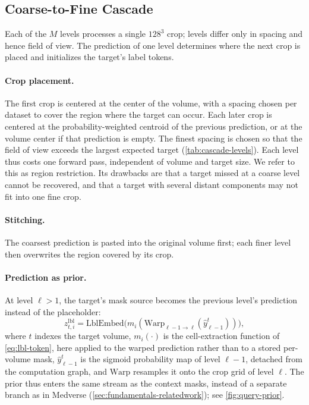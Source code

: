 \subsection{Coarse-to-Fine Cascade}\label{sec:methodology-cascade}

Each of the $M$ levels processes a single $128^3$ crop; levels differ only in
spacing and hence field of view. The prediction of one level determines where
the next crop is placed and initializes the target's label tokens.

\paragraph{Crop placement.}
The first crop is centered at the center of the volume, with a spacing chosen
per dataset to cover the region where the target can occur. Each later crop
is centered at the probability-weighted centroid of the previous prediction,
or at the volume center if that prediction is empty. The finest spacing is
chosen so that the field of view exceeds the largest expected target
(\autoref{tab:cascade-levels}). Each level thus costs one forward pass,
independent of volume and target size. We refer to this as region
restriction. Its drawbacks are that a target missed at a coarse level cannot
be recovered, and that a target with several distant components may not fit
into one fine crop.

\paragraph{Stitching.}
The coarsest prediction is pasted into the original volume first; each finer
level then overwrites the region covered by its crop.

\paragraph{Prediction as prior.}
At level $\ell > 1$, the target's mask source becomes the previous level's
prediction instead of the placeholder:
%
\begin{equation}
  z^{\text{lbl}}_{t,i} = \mathrm{LblEmbed}\big(m_i(\mathrm{Warp}_{\ell-1 \to \ell}(\hat{y}^t_{\ell-1}))\big),
  \label{eq:query-prior}
\end{equation}
%
where $t$ indexes the target volume, $m_i(\cdot)$ is the cell-extraction
function of \autoref{eq:lbl-token}, here applied to the warped prediction
rather than to a stored per-volume mask, $\hat{y}^t_{\ell-1}$ is the sigmoid
probability map of level $\ell{-}1$, detached from the computation graph, and
$\mathrm{Warp}$ resamples it onto the crop grid of level $\ell$. The prior thus enters the same stream as the
context masks, instead of a separate branch as in Medverse
(\autoref{sec:fundamentals-relatedwork}); see \autoref{fig:query-prior}.

